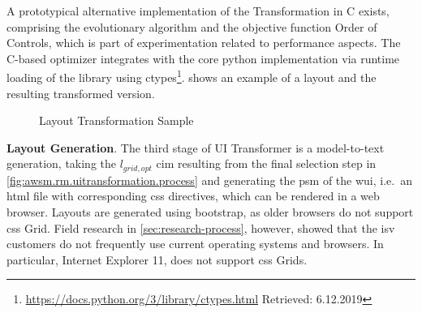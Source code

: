 A prototypical alternative implementation of the \gls{Transformation} in C exists, comprising the evolutionary algorithm and the objective function Order of Controls, which is part of experimentation related to performance aspects.
The C-based optimizer integrates with the core python implementation via runtime loading of the library using ctypes\footnote{\url{https://docs.python.org/3/library/ctypes.html} Retrieved: 6.12.2019}.
 shows an example of a \legacy layout and the resulting transformed version.

\begin{figure}[h!]
\centering

\qquad
{}

\caption{Layout Transformation Sample}
\label{fig:uitransformer.sample}
\end{figure}

\textbf{Layout Generation}.
The third stage of UI Transformer is a model-to-text generation, taking the \(l_{grid, opt}\) \gls{cim} resulting from the final selection step in \cref{fig:awsm.rm.uitransformation.process} and generating the \gls{psm} of the \gls{wui}, i.e.~an \gls{html} file with corresponding \gls{css} directives, which can be rendered in a \gls{web} browser.
Layouts are generated using bootstrap, as older browsers do not support \gls{css} Grid.
Field research in \cref{sec:research-process}, however, showed that the \gls{isv} customers do not frequently use current operating systems and browsers.
In particular, Internet Explorer 11, does not support \gls{css} Grids.

